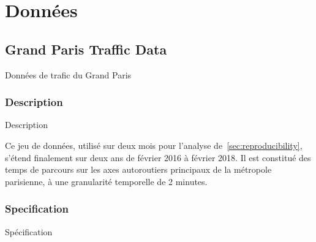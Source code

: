 \chapter{Données}



\label{app:data} %












\section{Grand Paris Traffic Data}{Données de trafic du Grand Paris}


\subsection{Description}{Description}

Ce jeu de données, utilisé sur deux mois pour l'analyse de~\ref{sec:reproducibility}, s'étend finalement sur deux ans de février 2016 à février 2018. Il est constitué des temps de parcours sur les axes autoroutiers principaux de la métropole parisienne, à une granularité temporelle de 2 minutes.

\subsection{Specification}{Spécification}

